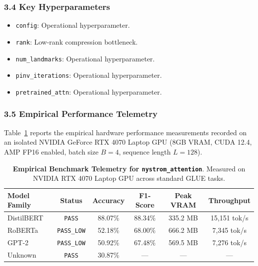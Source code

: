 \subsubsection*{3.4 Key Hyperparameters}
\begin{itemize}
    \item \texttt{config}: Operational hyperparameter.
    \item \texttt{rank}: Low-rank compression bottleneck.
    \item \texttt{num\_landmarks}: Operational hyperparameter.
    \item \texttt{pinv\_iterations}: Operational hyperparameter.
    \item \texttt{pretrained\_attn}: Operational hyperparameter.
\end{itemize}

\subsubsection*{3.5 Empirical Performance Telemetry}
Table~\ref{tab:telemetry_nystrom_attention} reports the empirical hardware performance measurements recorded on an isolated NVIDIA GeForce RTX 4070 Laptop GPU (8GB VRAM, CUDA 12.4, AMP FP16 enabled, batch size $B=4$, sequence length $L=128$).

\begin{table}[h]
\centering
\small
\caption{\textbf{Empirical Benchmark Telemetry for \texttt{nystrom\_attention}}. Measured on NVIDIA RTX 4070 Laptop GPU across standard GLUE tasks.}
\label{tab:telemetry_nystrom_attention}
\begin{tabular*}{\columnwidth}{@{\extracolsep{\fill}}lccccc}
\toprule
\textbf{Model Family} & \textbf{Status} & \textbf{Accuracy} & \textbf{F1-Score} & \textbf{Peak VRAM} & \textbf{Throughput} \\
\midrule
DistilBERT & \texttt{PASS} & 88.07\% & 88.34\% & 335.2 MB & 15,151 tok/s \\
RoBERTa & \texttt{PASS\_LOW} & 52.18\% & 68.00\% & 666.2 MB & 7,345 tok/s \\
GPT-2 & \texttt{PASS\_LOW} & 50.92\% & 67.48\% & 569.5 MB & 7,276 tok/s \\
Unknown & \texttt{PASS} & 30.87\% & --- & --- & --- \\
\bottomrule
\end{tabular*}
\end{table}

